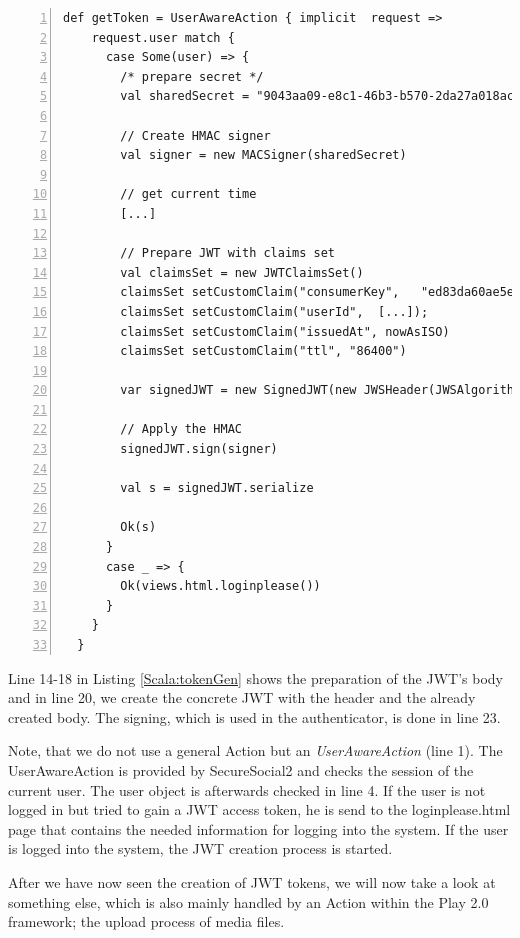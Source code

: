 \begin{lstlisting}[numbers=left,caption={Generation of JWT tokens within the backend},label=Scala:tokenGen,frame=tlbr,breaklines]
def getToken = UserAwareAction { implicit  request =>
    request.user match {
      case Some(user) => {
        /* prepare secret */
        val sharedSecret = "9043aa09-e8c1-46b3-b570-2da27a018ac3" getBytes

        // Create HMAC signer
        val signer = new MACSigner(sharedSecret)

        // get current time
        [...]

        // Prepare JWT with claims set
        val claimsSet = new JWTClaimsSet()
        claimsSet setCustomClaim("consumerKey",   "ed83da60ae5e4d159729eef16a207525")
        claimsSet setCustomClaim("userId",  [...]);
        claimsSet setCustomClaim("issuedAt", nowAsISO)
        claimsSet setCustomClaim("ttl", "86400")

        var signedJWT = new SignedJWT(new JWSHeader(JWSAlgorithm.HS256), claimsSet)

        // Apply the HMAC
        signedJWT.sign(signer)

        val s = signedJWT.serialize

        Ok(s)
      }
      case _ => {
        Ok(views.html.loginplease())
      }
    }
  }
\end{lstlisting}

Line 14-18 in Listing \ref{Scala:tokenGen} shows the preparation of the JWT's body and in line 20, we create the concrete JWT with the header and the already created body. The signing, which is used in the authenticator, is done in line 23. 

Note, that we do not use a general Action but an \emph{UserAwareAction} (line 1).
The UserAwareAction is provided by SecureSocial2 and checks the session of the current user. The user object is afterwards checked in line 4. If the user is not logged in but tried to gain a JWT access token, he is send to the loginplease.html page that contains the needed information for logging into the system. If the user is logged into the system, the JWT creation process is started.

After we have now seen the creation of JWT tokens, we will now take a look at something else, which is also mainly handled by an Action within the Play 2.0 framework; the upload process of media files. 

